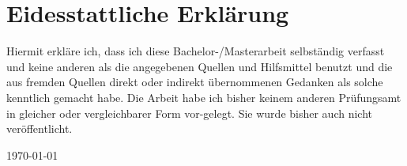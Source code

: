\thispagestyle{empty}
\par
\chapter*{Eidesstattliche Erklärung}

Hiermit erkläre ich, dass ich diese Bachelor-/Masterarbeit selbständig verfasst und keine anderen als die angegebenen Quellen und Hilfsmittel benutzt und die aus fremden Quellen direkt oder indirekt übernommenen Gedanken als solche kenntlich gemacht habe. Die Arbeit habe ich bisher keinem anderen Prüfungsamt in gleicher oder vergleichbarer Form vor-gelegt. Sie wurde bisher auch nicht veröffentlicht.


\today

\clearpage






